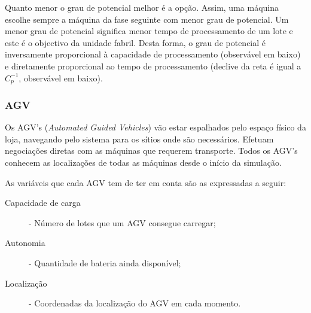 \begin{titlepage}
Quanto menor o grau de potencial melhor é a opção. Assim, uma máquina escolhe sempre a máquina da fase seguinte com menor grau de potencial. Um menor grau de potencial significa menor tempo de processamento de um lote e este é o objectivo da unidade fabril. Desta forma, o grau de potencial é inversamente proporcional à capacidade de processamento (observável em baixo) e diretamente proporcional ao tempo de processamento (declive da reta é igual a $C_{p}^{-1}$, observável em baixo).



\subsubsection{AGV}

Os AGV's (\textit{Automated Guided Vehicles}) vão estar espalhados pelo espaço físico da loja, navegando pelo sistema para os sítios onde são necessários. Efetuam negociações diretas com as máquinas que requerem transporte. Todos os AGV's conhecem as localizações de todas as máquinas desde o início da simulação. 

As variáveis que cada AGV tem de ter em conta são as expressadas a seguir:

\begin{description}
\item[Capacidade de carga] - Número de lotes que um AGV consegue carregar;
\item[Autonomia] - Quantidade de bateria ainda disponível;
\item[Localização] - Coordenadas da localização do AGV em cada momento.
\end{description}


\end{titlepage}
